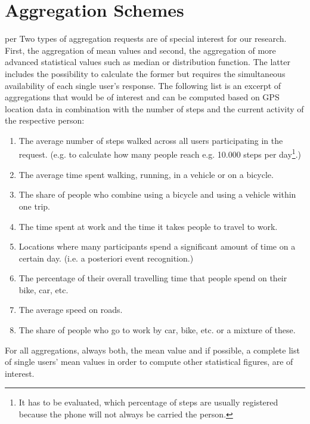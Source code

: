  \section{Aggregation Schemes}\label{aggregation-schemes}per
 Two types of aggregation requests are of special interest for our research. First, the aggregation of mean values and second, the aggregation of more advanced statistical values such as median or distribution function. The latter includes the possibility to calculate the former but requires the simultaneous availability of each single user's response. 
 The following list is an excerpt of aggregations that would be of interest and can be computed based on GPS location data in combination with the number of steps and the current activity of the respective person:
 \begin{enumerate}
 	\item The average number of steps walked across all users participating in the request. (e.g. to calculate how many people reach e.g. 10.000 steps per day\footnote{It has to be evaluated, which percentage of steps are usually registered because the phone will not always be carried the person.}.)
	\item The average time spent walking, running, in a vehicle or on a bicycle.
	\item The share of people who combine using a bicycle and using a vehicle within one trip.
	\item The time spent at work and the time it takes people to travel to work.
	\item Locations where many participants spend a significant amount of time on a certain day. (i.e. a posteriori event recognition.)
	\item The percentage of their overall travelling time that people spend on their bike, car, etc.
	\item The average speed on roads.
	\item The share of people who go to work by car, bike, etc. or a mixture of these.
 \end{enumerate}
 For all aggregations, always both, the mean value and if possible, a complete list of single users' mean values in order to compute other statistical figures, are of interest.

